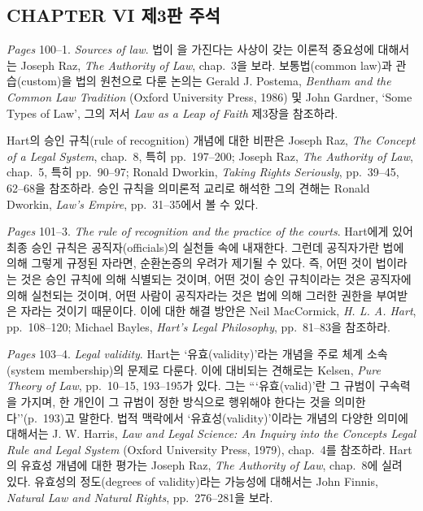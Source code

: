 {\subsection{CHAPTER VI 제3판 주석}\label{chapter-vi-3rd-ed.-notes}

\emph{Pages} 100--1. \emph{Sources of law}. 법이  을
가진다는 사상이 갖는 이론적 중요성에 대해서는 Joseph Raz, \emph{The
Authority of Law}, chap.~3을 보라. 보통법(common law)과 관습(custom)을
법의 원천으로 다룬 논의는 Gerald J. Postema, \emph{Bentham and the
Common Law Tradition} (Oxford University Press, 1986) 및 John Gardner,
`Some Types of Law', 그의 저서 \emph{Law as a Leap of Faith} 제3장을
참조하라.

Hart의 승인 규칙(rule of recognition) 개념에 대한 비판은 Joseph Raz,
\emph{The Concept of a Legal System}, chap.~8, 특히 pp.~197--200; Joseph
Raz, \emph{The Authority of Law}, chap.~5, 특히 pp.~90--97; Ronald
Dworkin, \emph{Taking Rights Seriously}, pp.~39--45, 62--68을 참조하라.
승인 규칙을 의미론적 교리로 해석한 그의 견해는 Ronald Dworkin,
\emph{Law's Empire}, pp.~31--35에서 볼 수 있다.

\emph{Pages} 101--3. \emph{The rule of recognition and the practice of
the courts}. Hart에게 있어 최종 승인 규칙은 공직자(officials)의 실천들
속에 내재한다. 그런데 공직자가란 법에 의해 그렇게 규정된 자라면,
순환논증의 우려가 제기될 수 있다. 즉, 어떤 것이 법이라는 것은 승인
규칙에 의해 식별되는 것이며, 어떤 것이 승인 규칙이라는 것은 공직자에
의해 실천되는 것이며, 어떤 사람이 공직자라는 것은 법에 의해 그러한
권한을 부여받은 자라는 것이기 때문이다. 이에 대한 해결 방안은 Neil
MacCormick, \emph{H. L. A. Hart}, pp.~108--120; Michael Bayles,
\emph{Hart's Legal Philosophy}, pp.~81--83을 참조하라.

\emph{Pages} 103--4. \emph{Legal validity}. Hart는 `유효(validity)'라는
개념을 주로 체계 소속(system membership)의 문제로 다룬다. 이에 대비되는
견해로는 Kelsen, \emph{Pure Theory of Law}, pp.~10--15, 193--195가 있다.
그는 ```유효(valid)'란 그 규범이 구속력을 가지며, 한 개인이 그 규범이
정한 방식으로 행위해야 한다는 것을 의미한다''(p.~193)고 말한다. 법적
맥락에서 `유효성(validity)'이라는 개념의 다양한 의미에 대해서는 J. W.
Harris, \emph{Law and Legal Science: An Inquiry into the Concepts Legal
Rule and Legal System} (Oxford University Press, 1979), chap.~4를
참조하라. Hart의 유효성 개념에 대한 평가는 Joseph Raz, \emph{The
Authority of Law}, chap.~8에 실려 있다. 유효성의 정도(degrees of
validity)라는 가능성에 대해서는 John Finnis, \emph{Natural Law and
Natural Rights}, pp.~276--281을 보라.

}
